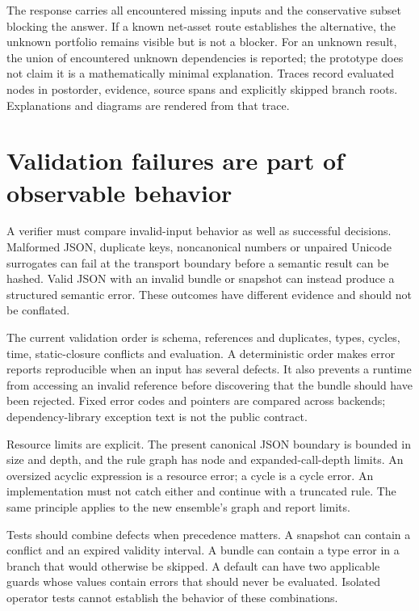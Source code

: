 The response carries all encountered missing inputs and the conservative subset
blocking the answer. If a known net-asset route establishes the alternative,
the unknown portfolio remains visible but is not a blocker. For an unknown
result, the union of encountered unknown dependencies is reported; the prototype
does not claim it is a mathematically minimal explanation. Traces record evaluated
nodes in postorder, evidence, source spans and explicitly skipped branch roots.
Explanations and diagrams are rendered from that trace.

\section{Validation failures are part of observable behavior}
\label{merge:M07:04}


A verifier must compare invalid-input behavior as well as successful decisions.
Malformed JSON, duplicate keys, noncanonical numbers or unpaired Unicode
surrogates can fail at the transport boundary before a semantic result can be
hashed. Valid JSON with an invalid bundle or snapshot can instead produce a
structured semantic error. These outcomes have different evidence and should
not be conflated.

The current validation order is schema, references and duplicates, types, cycles,
time, static-closure conflicts and evaluation. A deterministic order makes error
reports reproducible when an input has several defects. It also prevents a
runtime from accessing an invalid reference before discovering that the bundle
should have been rejected. Fixed error codes and pointers are compared across
backends; dependency-library exception text is not the public contract.


Resource limits are explicit. The present canonical JSON boundary is bounded in
size and depth, and the rule graph has node and expanded-call-depth limits. An
oversized acyclic expression is a resource error; a cycle is a cycle error. An
implementation must not catch either and continue with a truncated rule. The
same principle applies to the new ensemble's graph and report limits.

Tests should combine defects when precedence matters. A snapshot can contain a
conflict and an expired validity interval. A bundle can contain a type error in a
branch that would otherwise be skipped. A default can have two applicable guards
whose values contain errors that should never be evaluated. Isolated operator
tests cannot establish the behavior of these combinations.

